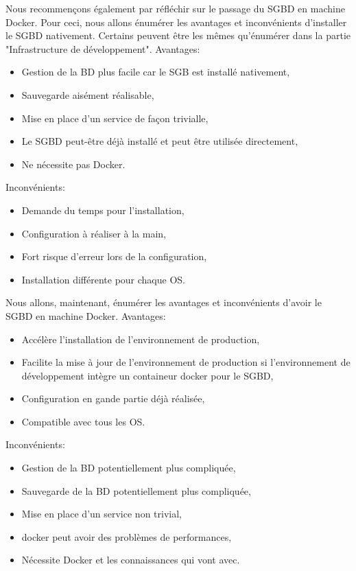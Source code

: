 \documentclass[
    iai, %
    il, %
]{heig-tb}
\begin{document}
Nous recommençons également par réfléchir sur le passage du SGBD en machine Docker.
Pour ceci, nous allons énumérer les avantages et inconvénients d'installer le SGBD nativement.
Certains peuvent être les mêmes qu'énumérer dans la partie "Infrastructure de développement". %
Avantages:
\begin{itemize}
    \item Gestion de la BD plus facile car le SGB est installé nativement,
    \item Sauvegarde aisément réalisable,
    \item Mise en place d'un service de façon trivialle,
    \item Le SGBD peut-être déjà installé et peut être utilisée directement,
    \item Ne nécessite pas Docker.
\end{itemize}

Inconvénients:
\begin{itemize}
    \item Demande du temps pour l'installation,
    \item Configuration à réaliser à la main,
    \item Fort risque d'erreur lors de la configuration,
    \item Installation différente pour chaque OS.
\end{itemize}

Nous allons, maintenant, énumérer les avantages et inconvénients d'avoir le SGBD en machine Docker.
Avantages:
\begin{itemize}
    \item Accélère l'installation de l'environnement de production,
    \item Facilite la mise à jour de l'environnement de production si l'environnement de développement intègre un containeur docker pour le SGBD,
    \item Configuration en gande partie déjà réalisée,
    \item Compatible avec tous les OS.
\end{itemize}

Inconvénients:
\begin{itemize}
    \item Gestion de la BD potentiellement plus compliquée,
    \item Sauvegarde de la BD potentiellement plus compliquée,
    \item Mise en place d'un service non trivial,
    \item \Gls{docker} peut avoir des problèmes de performances, \cite{labrecque}
    \item Nécessite Docker et les connaissances qui vont avec. \cite{labrecque}
\end{itemize}
\end{document}
